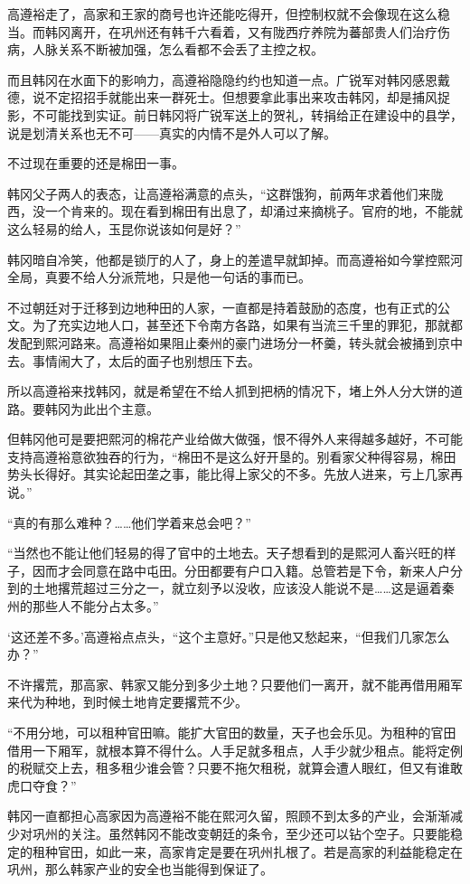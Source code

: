 高遵裕走了，高家和王家的商号也许还能吃得开，但控制权就不会像现在这么稳当。而韩冈离开，在巩州还有韩千六看着，又有陇西疗养院为蕃部贵人们治疗伤病，人脉关系不断被加强，怎么看都不会丢了主控之权。

而且韩冈在水面下的影响力，高遵裕隐隐约约也知道一点。广锐军对韩冈感恩戴德，说不定招招手就能出来一群死士。但想要拿此事出来攻击韩冈，却是捕风捉影，不可能找到实证。前日韩冈将广锐军送上的贺礼，转捐给正在建设中的县学，说是划清关系也无不可——真实的内情不是外人可以了解。

不过现在重要的还是棉田一事。

韩冈父子两人的表态，让高遵裕满意的点头，“这群饿狗，前两年求着他们来陇西，没一个肯来的。现在看到棉田有出息了，却涌过来摘桃子。官府的地，不能就这么轻易的给人，玉昆你说该如何是好？”

韩冈暗自冷笑，他都是锁厅的人了，身上的差遣早就卸掉。而高遵裕如今掌控熙河全局，真要不给人分派荒地，只是他一句话的事而已。

不过朝廷对于迁移到边地种田的人家，一直都是持着鼓励的态度，也有正式的公文。为了充实边地人口，甚至还下令南方各路，如果有当流三千里的罪犯，那就都发配到熙河路来。高遵裕如果阻止秦州的豪门进场分一杯羹，转头就会被捅到京中去。事情闹大了，太后的面子也别想压下去。

所以高遵裕来找韩冈，就是希望在不给人抓到把柄的情况下，堵上外人分大饼的道路。要韩冈为此出个主意。

但韩冈他可是要把熙河的棉花产业给做大做强，恨不得外人来得越多越好，不可能支持高遵裕意欲独吞的行为，“棉田不是这么好开垦的。别看家父种得容易，棉田势头长得好。其实论起田垄之事，能比得上家父的不多。先放人进来，亏上几家再说。”

“真的有那么难种？……他们学着来总会吧？”

“当然也不能让他们轻易的得了官中的土地去。天子想看到的是熙河人畜兴旺的样子，因而才会同意在路中屯田。分田都要有户口入籍。总管若是下令，新来人户分到的土地撂荒超过三分之一，就立刻予以没收，应该没人能说不是……这是逼着秦州的那些人不能分占太多。”

‘这还差不多。’高遵裕点点头，“这个主意好。”只是他又愁起来，“但我们几家怎么办？”

不许撂荒，那高家、韩家又能分到多少土地？只要他们一离开，就不能再借用厢军来代为种地，到时候土地肯定要撂荒不少。

“不用分地，可以租种官田嘛。能扩大官田的数量，天子也会乐见。为租种的官田借用一下厢军，就根本算不得什么。人手足就多租点，人手少就少租点。能将定例的税赋交上去，租多租少谁会管？只要不拖欠租税，就算会遭人眼红，但又有谁敢虎口夺食？”

韩冈一直都担心高家因为高遵裕不能在熙河久留，照顾不到太多的产业，会渐渐减少对巩州的关注。虽然韩冈不能改变朝廷的条令，至少还可以钻个空子。只要能稳定的租种官田，如此一来，高家肯定是要在巩州扎根了。若是高家的利益能稳定在巩州，那么韩家产业的安全也当能得到保证了。

